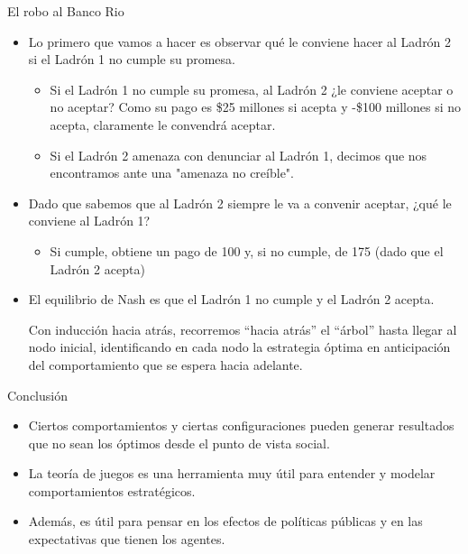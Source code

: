 \documentclass{beamer}
\begin{document}
\begin{frame}{El robo al Banco Rio}
    \begin{itemize}
        \item Lo primero que vamos a hacer es observar qué le conviene hacer al Ladrón 2 si el Ladrón 1 no cumple su promesa.
         \begin{itemize}
        \item Si el Ladrón 1 no cumple su promesa, al Ladrón 2 ¿le conviene aceptar o no aceptar? Como su pago es \$25 millones si acepta y -\$100 millones si no acepta, claramente
        le convendrá aceptar.
        \item Si el Ladrón 2 amenaza con denunciar al Ladrón 1, decimos que nos encontramos ante una "amenaza no creíble".
        \end{itemize}
        \item Dado que sabemos que al Ladrón 2 siempre le va a convenir aceptar, ¿qué le conviene al Ladrón 1?
       \begin{itemize}
        \item Si cumple, obtiene un pago de 100 y, si no cumple, de 175 (dado que el Ladrón 2 acepta)
        \end{itemize}
        \item El equilibrio de Nash es que el Ladrón 1 no cumple y el Ladrón 2 acepta.
        \begin{boxB}
            \centering \small
            Con inducción hacia atrás, recorremos ``hacia atrás'' el ``árbol'' hasta llegar
            al nodo inicial, identificando en cada nodo la estrategia óptima en
            anticipación del comportamiento que se espera hacia adelante.            
        \end{boxB}
    \end{itemize}
\end{frame}

\begin{frame}{Conclusión}
    \begin{itemize}
        \item Ciertos comportamientos y ciertas configuraciones pueden generar resultados que no sean los óptimos desde el punto de vista social.
        \item La teoría de juegos es una herramienta muy útil para entender y modelar comportamientos estratégicos.
        \item Además, es útil para pensar en los efectos de políticas públicas y en las expectativas que tienen los agentes.
    \end{itemize}
\end{frame}
\end{document}
